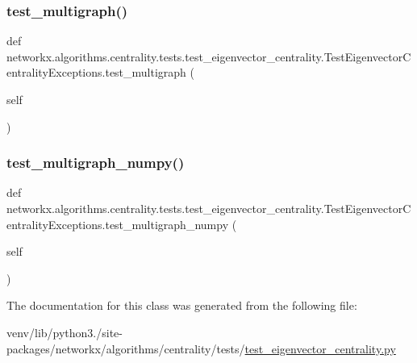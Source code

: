 \subsubsection{\texorpdfstring{test\+\_\+multigraph()}{test\_multigraph()}}
{\footnotesize\ttfamily def networkx.\+algorithms.\+centrality.\+tests.\+test\+\_\+eigenvector\+\_\+centrality.\+Test\+Eigenvector\+Centrality\+Exceptions.\+test\+\_\+multigraph (\begin{DoxyParamCaption}\item[{}]{self }\end{DoxyParamCaption})}

\mbox{\label{classnetworkx_1_1algorithms_1_1centrality_1_1tests_1_1test__eigenvector__centrality_1_1TestEigenvectorCentralityExceptions_a93280526baac17bdb691b44b8c048759}} 
\subsubsection{\texorpdfstring{test\+\_\+multigraph\+\_\+numpy()}{test\_multigraph\_numpy()}}
{\footnotesize\ttfamily def networkx.\+algorithms.\+centrality.\+tests.\+test\+\_\+eigenvector\+\_\+centrality.\+Test\+Eigenvector\+Centrality\+Exceptions.\+test\+\_\+multigraph\+\_\+numpy (\begin{DoxyParamCaption}\item[{}]{self }\end{DoxyParamCaption})}



The documentation for this class was generated from the following file\+:\begin{DoxyCompactItemize}
\item 
venv/lib/python3./site-\/packages/networkx/algorithms/centrality/tests/\hyperlink{test__eigenvector__centrality_8py}{test\+\_\+eigenvector\+\_\+centrality.\+py}\end{DoxyCompactItemize}
